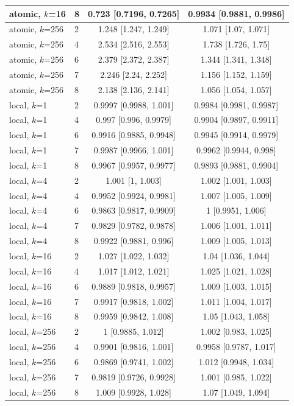{\begin{longtable}{llcc}
atomic, $k$=16 & 8 & 0.723 [0.7196, 0.7265] & 0.9934 [0.9881, 0.9986] \\
\midrule
atomic, $k$=256 & 2 & 1.248 [1.247, 1.249] & 1.071 [1.07, 1.071] \\
atomic, $k$=256 & 4 & 2.534 [2.516, 2.553] & 1.738 [1.726, 1.75] \\
atomic, $k$=256 & 6 & 2.379 [2.372, 2.387] & 1.344 [1.341, 1.348] \\
atomic, $k$=256 & 7 & 2.246 [2.24, 2.252] & 1.156 [1.152, 1.159] \\
atomic, $k$=256 & 8 & 2.138 [2.136, 2.141] & 1.056 [1.054, 1.057] \\
\midrule
local, $k$=1 & 2 & 0.9997 [0.9988, 1.001] & 0.9984 [0.9981, 0.9987] \\
local, $k$=1 & 4 & 0.997 [0.996, 0.9979] & 0.9904 [0.9897, 0.9911] \\
local, $k$=1 & 6 & 0.9916 [0.9885, 0.9948] & 0.9945 [0.9914, 0.9979] \\
local, $k$=1 & 7 & 0.9987 [0.9966, 1.001] & 0.9962 [0.9944, 0.998] \\
local, $k$=1 & 8 & 0.9967 [0.9957, 0.9977] & 0.9893 [0.9881, 0.9904] \\
\midrule
local, $k$=4 & 2 & 1.001 [1, 1.003] & 1.002 [1.001, 1.003] \\
local, $k$=4 & 4 & 0.9952 [0.9924, 0.9981] & 1.007 [1.005, 1.009] \\
local, $k$=4 & 6 & 0.9863 [0.9817, 0.9909] & 1 [0.9951, 1.006] \\
local, $k$=4 & 7 & 0.9829 [0.9782, 0.9878] & 1.006 [1.001, 1.011] \\
local, $k$=4 & 8 & 0.9922 [0.9881, 0.996] & 1.009 [1.005, 1.013] \\
\midrule
local, $k$=16 & 2 & 1.027 [1.022, 1.032] & 1.04 [1.036, 1.044] \\
local, $k$=16 & 4 & 1.017 [1.012, 1.021] & 1.025 [1.021, 1.028] \\
local, $k$=16 & 6 & 0.9889 [0.9818, 0.9957] & 1.009 [1.003, 1.015] \\
local, $k$=16 & 7 & 0.9917 [0.9818, 1.002] & 1.011 [1.004, 1.017] \\
local, $k$=16 & 8 & 0.9959 [0.9842, 1.008] & 1.05 [1.043, 1.058] \\
\midrule
local, $k$=256 & 2 & 1 [0.9885, 1.012] & 1.002 [0.983, 1.025] \\
local, $k$=256 & 4 & 0.9901 [0.9816, 1.001] & 0.9958 [0.9787, 1.017] \\
local, $k$=256 & 6 & 0.9869 [0.9741, 1.002] & 1.012 [0.9948, 1.034] \\
local, $k$=256 & 7 & 0.9819 [0.9726, 0.9928] & 1.001 [0.985, 1.022] \\
local, $k$=256 & 8 & 1.009 [0.9928, 1.028] & 1.07 [1.049, 1.094] \\
\end{longtable}
}

